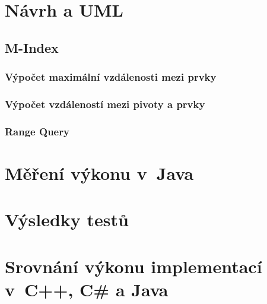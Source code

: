 \section{Návrh a UML}
\subsection{\BPTree}
\subsection{M-Index}
\subsubsection{Výpočet maximální vzdálenosti mezi prvky}
\subsubsection{Výpočet vzdáleností mezi pivoty a prvky}
\subsubsection{Range Query}

\section{Měření výkonu v~Java\label{sub:M=00011B=000159en=0000ED-v=0000FDkonu-vJava}}


\section{Výsledky testů}


\section{Srovnání výkonu implementací v~C++, C\# a Java}
